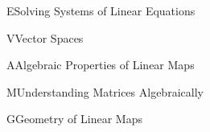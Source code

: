 \documentclass{article}[12pt]
\begin{document}
\begin{module}{E}{Solving Systems of Linear Equations}

\end{module}

\begin{module}{V}{Vector Spaces}

\end{module}

\begin{module}{A}{Algebraic Properties of Linear Maps}

\end{module}

\begin{module}{M}{Understanding Matrices Algebraically}

\end{module}

\begin{module}{G}{Geometry of Linear Maps}

\end{module}
\end{document}
